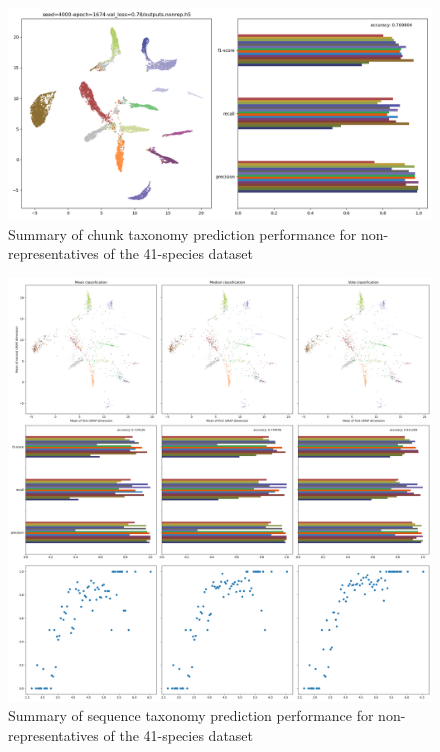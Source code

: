 \documentclass{article}
\begin{document}
\begin{figure}
  \includegraphics[width=\linewidth]{new_journal/figures/ar122_r89.genomic.medium/chunks_W4000_S4000/roznet/o256_g4_b32_lr0.001_16bit_A4/nonrep/summary.png}
  \caption{Summary of chunk taxonomy prediction performance for non-representatives of the 41-species dataset}
  \label{fig:summary_roznet_medium_nonrep}
\end{figure}

\begin{figure}
  \includegraphics[width=\linewidth]{new_journal/figures/ar122_r89.genomic.medium/chunks_W4000_S4000/roznet/o256_g4_b32_lr0.001_16bit_A4/nonrep/summary.aggregated.png}
  \caption{Summary of sequence taxonomy prediction performance for non-representatives of the 41-species dataset}
  \label{fig:summary_aggregated_roznet_medium_nonrep}
\end{figure}
\end{document}
